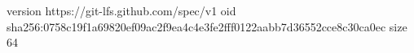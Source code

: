 version https://git-lfs.github.com/spec/v1
oid sha256:0758c19f1a69820ef09ac2f9ea4c4e3fe2fff0122aabb7d36552cce8c30ca0ec
size 64
